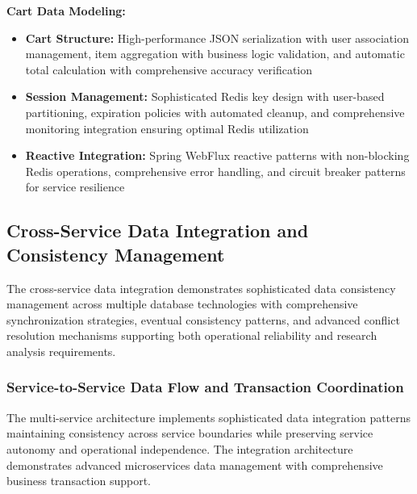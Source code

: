 \textbf{Cart Data Modeling:}
\begin{itemize}
\item \textbf{Cart Structure:} High-performance JSON serialization with user association management, item aggregation with business logic validation, and automatic total calculation with comprehensive accuracy verification
\item \textbf{Session Management:} Sophisticated Redis key design with user-based partitioning, expiration policies with automated cleanup, and comprehensive monitoring integration ensuring optimal Redis utilization
\item \textbf{Reactive Integration:} Spring WebFlux reactive patterns with non-blocking Redis operations, comprehensive error handling, and circuit breaker patterns for service resilience
\end{itemize}

\subsection{Cross-Service Data Integration and Consistency Management}

The cross-service data integration demonstrates sophisticated data consistency management across multiple database technologies with comprehensive synchronization strategies, eventual consistency patterns, and advanced conflict resolution mechanisms supporting both operational reliability and research analysis requirements.

\subsubsection{Service-to-Service Data Flow and Transaction Coordination}

The multi-service architecture implements sophisticated data integration patterns maintaining consistency across service boundaries while preserving service autonomy and operational independence. The integration architecture demonstrates advanced microservices data management with comprehensive business transaction support.

